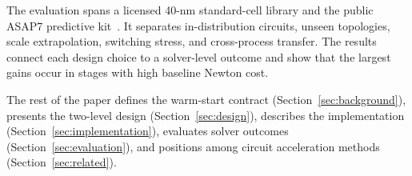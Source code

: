 The evaluation spans a licensed 40-nm standard-cell library and the public ASAP7 predictive kit~\cite{clark2016asap7}. It separates in-distribution circuits, unseen topologies, scale extrapolation, switching stress, and cross-process transfer. The results connect each design choice to a solver-level outcome and show that the largest gains occur in stages with high baseline Newton cost.

The rest of the paper defines the warm-start contract (Section~\ref{sec:background}), presents the two-level design (Section~\ref{sec:design}), describes the implementation (Section~\ref{sec:implementation}), evaluates solver outcomes (Section~\ref{sec:evaluation}), and positions \system{} among circuit acceleration methods (Section~\ref{sec:related}).

